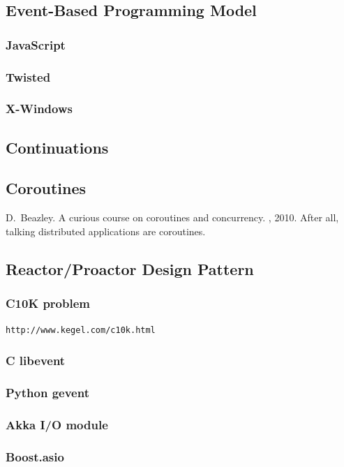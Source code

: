 \documentclass{myproc}
\begin{document}
\subsection{Event-Based Programming Model}
\subsubsection{JavaScript}
\subsubsection{Twisted}
\subsubsection{X-Windows}

\subsection{\textcolor{red2}{\bf{}Continuations}}
\subsection{\textcolor{red2}{\bf{}Coroutines}}
\bit
\w \textcolor{blue2}{D.~Beazley.
\newblock A curious course on coroutines and concurrency.
, 2010.}
\w After all, talking distributed applications are coroutines.
\eit

\subsection{\textcolor{red2}{\bf{}Reactor/Proactor Design Pattern}}
\subsubsection{C10K problem}
\verb+http://www.kegel.com/c10k.html+
\subsubsection{C libevent}
\subsubsection{Python gevent}
\subsubsection{Akka I/O module}
\subsubsection{Boost.asio}
\end{document}
